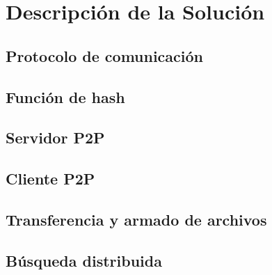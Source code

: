 \section{Descripción de la Solución}

\subsection{Protocolo de comunicación}

\subsection{Función de hash}

\subsection{Servidor P2P}

\subsection{Cliente P2P}

\subsection{Transferencia y armado de archivos}

\subsection{Búsqueda distribuida}

